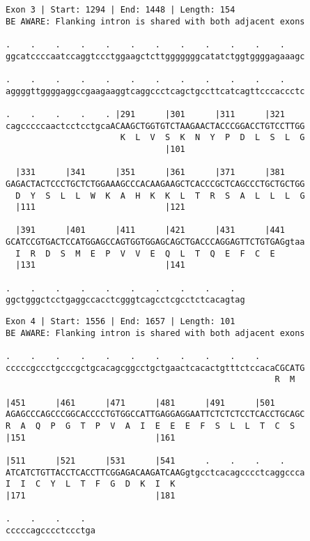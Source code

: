\documentclass{article}
\begin{document}
\begin{Verbatim}
Exon 3 | Start: 1294 | End: 1448 | Length: 154
BE AWARE: Flanking intron is shared with both adjacent exons
 
.    .    .    .    .    .    .    .    .    .    .    .    
ggcatccccaatccaggtccctggaagctcttgggggggcatatctggtggggagaaagc
  
.    .    .    .    .    .    .    .    .    .    .    .    
aggggttggggaggccgaagaaggtcaggccctcagctgccttcatcagttcccaccctc
  
.    .    .    .    . |291      |301      |311      |321    
cagcccccaactcctcctgcaACAAGCTGGTGTCTAAGAACTACCCGGACCTGTCCTTGG
                       K  L  V  S  K  N  Y  P  D  L  S  L  G
                                |101                        
  
  |331      |341      |351      |361      |371      |381    
GAGACTACTCCCTGCTCTGGAAAGCCCACAAGAAGCTCACCCGCTCAGCCCTGCTGCTGG
  D  Y  S  L  L  W  K  A  H  K  K  L  T  R  S  A  L  L  L  G
  |111                          |121                        
  
  |391      |401      |411      |421      |431      |441    
GCATCCGTGACTCCATGGAGCCAGTGGTGGAGCAGCTGACCCAGGAGTTCTGTGAGgtaa
  I  R  D  S  M  E  P  V  V  E  Q  L  T  Q  E  F  C  E      
  |131                          |141                        
  
.    .    .    .    .    .    .    .    .    .  
ggctgggctcctgaggccacctcgggtcagcctcgcctctcacagtag
\end{Verbatim}
\newpage
\begin{Verbatim}
Exon 4 | Start: 1556 | End: 1657 | Length: 101
BE AWARE: Flanking intron is shared with both adjacent exons
 
.    .    .    .    .    .    .    .    .    .    .         
cccccgccctgcccgctgcacagcggcctgctgaactcacactgtttctccacaCGCATG
                                                      R  M  
  
|451      |461      |471      |481      |491      |501      
AGAGCCCAGCCCGGCACCCCTGTGGCCATTGAGGAGGAATTCTCTCTCCTCACCTGCAGC
R  A  Q  P  G  T  P  V  A  I  E  E  E  F  S  L  L  T  C  S  
|151                          |161                          
  
|511      |521      |531      |541      .    .    .    .    
ATCATCTGTTACCTCACCTTCGGAGACAAGATCAAGgtgcctcacagcccctcaggccca
I  I  C  Y  L  T  F  G  D  K  I  K                          
|171                          |181                          
  
.    .    .    .  
cccccagcccctccctga
\end{Verbatim}
\end{document}
